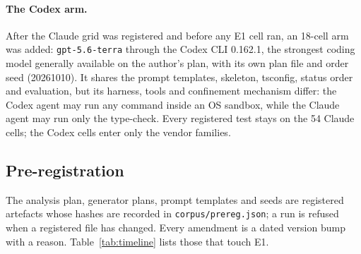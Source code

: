 \documentclass[10pt,a4paper]{article}
\begin{document}
\paragraph{The Codex arm.} After the Claude grid was registered and before any E1 cell ran, an 18-cell arm was added:
\texttt{gpt-5.6-terra} through the Codex CLI 0.162.1, the strongest coding model generally available on the
author's plan, with its own plan file and order seed (20261010). %
It shares the prompt templates, skeleton, tsconfig, status order and evaluation, but its harness, tools and
confinement mechanism differ: the Codex agent may run any command inside an OS sandbox, while the Claude agent may run
only the type-check. %
Every registered test stays on the 54 Claude cells; the Codex cells enter only the vendor families.

\subsection{Pre-registration}

The analysis plan, generator plans, prompt templates and seeds are registered artefacts whose hashes are recorded
in \texttt{corpus/prereg.json}; a run is refused when a registered file has changed. %
Every amendment is a dated version bump with a reason. Table~\ref{tab:timeline} lists those that touch E1.
\end{document}
